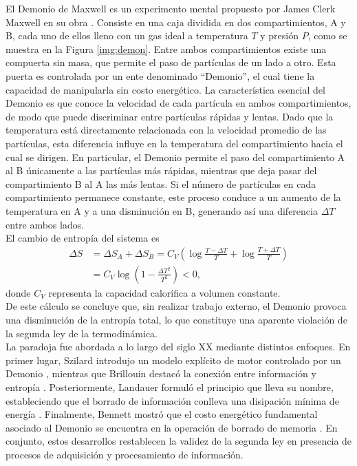 El Demonio de Maxwell es un experimento mental propuesto por James Clerk Maxwell en su obra \cite{Maxwell_1871}. Consiste en una caja dividida en dos compartimientos, A y B, cada uno de ellos lleno con un gas ideal a temperatura $T$ y presión $P$, como se muestra en la Figura \ref{img:demon}. Entre ambos compartimientos existe una compuerta sin masa, que permite el paso de partículas de un lado a otro. Esta puerta es controlada por un ente denominado ``Demonio'', el cual tiene la capacidad de manipularla sin costo energético. La característica esencial del Demonio es que conoce la velocidad de cada partícula en ambos compartimientos, de modo que puede discriminar entre partículas rápidas y lentas. Dado que la temperatura está directamente relacionada con la velocidad promedio de las partículas, esta diferencia influye en la temperatura del compartimiento hacia el cual se dirigen. En particular, el Demonio permite el paso del compartimiento A al B únicamente a las partículas más rápidas, mientras que deja pasar del compartimiento B al A las más lentas. Si el número de partículas en cada compartimiento permanece constante, este proceso conduce a un aumento de la temperatura en A y a una disminución en B, generando así una diferencia $\Delta T$ entre ambos lados.
\\

El cambio de entropía del sistema es
\begin{align*}
    \Delta S & = \Delta S_{A} + \Delta S_{B} = C_{V}\left( \log \frac{T-\Delta T}{T} + \log \frac{T+\Delta T}{T} \right) \\
       & =  C_{V} \log \left( 1 - \frac{\Delta T^{2}}{T^{2}}  \right) < 0,
\end{align*}
donde \( C_V \) representa la capacidad calorífica a volumen constante.
\\

De este cálculo se concluye que, sin realizar trabajo externo, el Demonio provoca una disminución de la entropía total, lo que constituye una aparente violación de la segunda ley de la termodinámica.
\\

La paradoja fue abordada a lo largo del siglo XX mediante distintos enfoques. En primer lugar, Szilard introdujo un modelo explícito de motor controlado por un Demonio \cite{szilard1964decrease}, mientras que Brillouin destacó la conexión entre información y entropía \cite{brillouin1951maxwell}. Posteriormente, Landauer formuló el principio que lleva su nombre, estableciendo que el borrado de información conlleva una disipación mínima de energía \cite{Landauer_1961}. Finalmente, Bennett mostró que el costo energético fundamental asociado al Demonio se encuentra en la operación de borrado de memoria \cite{bennett1982thermodynamics}. En conjunto, estos desarrollos restablecen la validez de la segunda ley en presencia de procesos de adquisición y procesamiento de información.
\\

